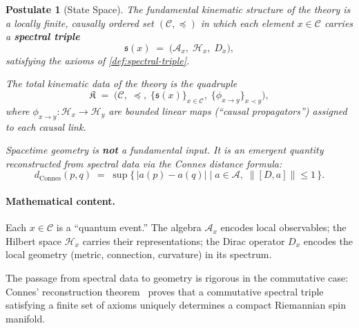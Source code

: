 \documentclass[12pt,a4paper]{article}
\theoremstyle{postulate}
\newtheorem{postulate}{Postulate}
\newcommand{\Hil}{\mathcal{H}}
\newcommand{\Alg}{\mathcal{A}}
\newcommand{\Dirac}{D}
\newcommand{\Causal}{\mathcal{C}}
\begin{document}
\begin{postulate}[State Space]\label{post:kinematics}
The fundamental kinematic structure of the theory is a locally finite,
causally ordered set $(\Causal, \preceq)$ in which each element
$x \in \Causal$ carries a \textbf{spectral triple}
\begin{equation}\label{eq:local-triple}
  \mathfrak{s}(x) \;=\; \bigl(\Alg_x,\; \Hil_x,\; \Dirac_x\bigr),
\end{equation}
satisfying the axioms of \cref{def:spectral-triple}.

The total kinematic data of the theory is the quadruple
\begin{equation}\label{eq:total-kinematics}
  \mathfrak{K} \;=\; \bigl(\Causal,\; \preceq,\; \{\mathfrak{s}(x)\}_{x \in \Causal},\;
                      \{\phi_{x \to y}\}_{x \prec y}\bigr),
\end{equation}
where $\phi_{x \to y} : \Hil_x \to \Hil_y$ are bounded linear maps
(``causal propagators'') assigned to each causal link.

Spacetime geometry is \textbf{not} a fundamental input.  It is an emergent
quantity reconstructed from spectral data via the Connes distance formula:
\begin{equation}\label{eq:connes-distance}
  d_{\mathrm{Connes}}(p, q)
  \;=\; \sup\bigl\{\,|a(p) - a(q)| \;\big|\;
        a \in \Alg,\; \|[\Dirac, a]\| \leq 1\,\bigr\}.
\end{equation}
\end{postulate}

\paragraph{Mathematical content.}
Each $x \in \Causal$ is a ``quantum event.''  The algebra $\Alg_x$ encodes
local observables; the Hilbert space $\Hil_x$ carries their representations;
the Dirac operator $\Dirac_x$ encodes the local geometry (metric,
connection, curvature) in its spectrum.

The passage from spectral data to geometry is rigorous in the commutative
case: Connes' reconstruction theorem~\cite{Connes2008Reconstruction} proves
that a commutative spectral triple satisfying a finite set of axioms
uniquely determines a compact Riemannian spin manifold.
\end{document}
